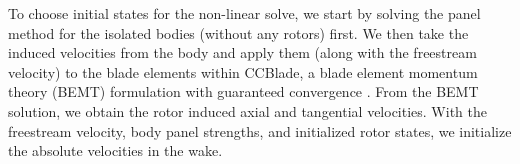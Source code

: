 




To choose initial states for the non-linear solve, we start by solving the panel method for the isolated bodies (without any rotors) first.
%
We then take the induced velocities from the body and apply them (along with the freestream velocity) to the blade elements within CCBlade, a blade element momentum theory (BEMT) formulation with guaranteed convergence . %
%
From the BEMT solution, we obtain the rotor induced axial and tangential velocities.
%
With the freestream velocity, body panel strengths, and initialized rotor states, we initialize the absolute velocities in the wake.



